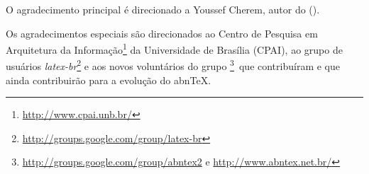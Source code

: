
\begin{agradecimentos}
  O agradecimento principal é direcionado a Youssef Cherem, autor do  ().
  
  Os agradecimentos especiais são direcionados ao Centro de Pesquisa em Arquitetura da Informação\footnote{\url{http://www.cpai.unb.br/}} da Universidade de Brasília (CPAI), ao grupo de usuários \emph{latex-br}\footnote{\url{http://groups.google.com/group/latex-br}} e aos novos voluntários do grupo \emph{\abnTeX}\footnote{\url{http://groups.google.com/group/abntex2} e \url{http://www.abntex.net.br/}}~que contribuíram e que ainda contribuirão para a evolução do abn\TeX.
  
\end{agradecimentos}
